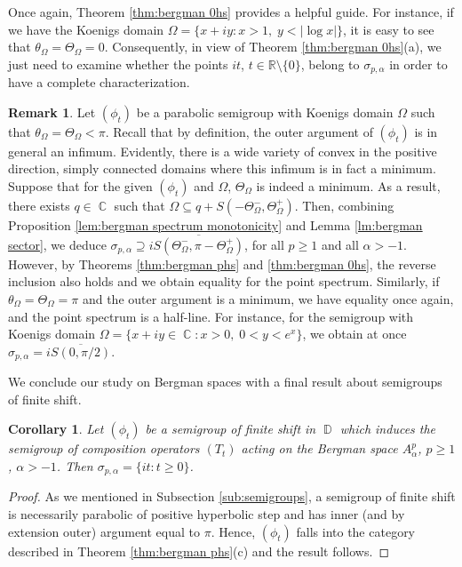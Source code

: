 \documentclass[11pt]{amsart}
\numberwithin{equation}{section}
\newtheorem{corollary}[theorem]{Corollary}
\theoremstyle{definition}
\newtheorem{remark}[theorem]{Remark}
\DeclareMathOperator{\C}{\mathbb{C}}
\DeclareMathOperator{\D}{\mathbb{D}}
\begin{document}
	Once again, Theorem \ref{thm:bergman 0hs} provides a helpful guide. For instance, if we have the Koenigs domain $\Omega=\{x+iy:x>1,\; y<|\log x|\}$, it is easy to see that $\theta_\Omega=\Theta_\Omega=0$. Consequently, in view of Theorem \ref{thm:bergman 0hs}(a), we just need to examine whether the points $it$, $t\in\mathbb{R}\setminus\{0\}$, belong to $\sigma_{p,\alpha}$ in order to have a complete characterization.
	
	\begin{remark}\label{rem:equality when outer argument is minimum}
		Let $(\phi_t)$ be a parabolic semigroup with Koenigs domain $\Omega$ such that $\theta_\Omega=\Theta_\Omega<\pi$. Recall that by definition, the outer argument of $(\phi_t)$ is in general an infimum. Evidently, there is a wide variety of convex in the positive direction, simply connected domains where this infimum is in fact a minimum. Suppose that for the given $(\phi_t)$ and $\Omega$, $\Theta_\Omega$ is indeed a minimum. As a result, there exists $q\in\C$ such that $\Omega\subseteq q+S(-\Theta_\Omega^-,\Theta_\Omega^+)$. Then, combining Proposition \ref{lem:bergman spectrum monotonicity} and Lemma \ref{lm:bergman sector}, we deduce $\sigma_{p,\alpha}\supseteq i\overline{S(\Theta_\Omega^-,\pi-\Theta_\Omega^+)}$, for all $p\ge1$ and all $\alpha>-1$. However, by Theorems \ref{thm:bergman phs} and \ref{thm:bergman 0hs}, the reverse inclusion also holds and we obtain equality for the point spectrum. Similarly, if $\theta_\Omega=\Theta_\Omega=\pi$ and the outer argument is a minimum, we have equality once again, and the point spectrum is a half-line. For instance, for the semigroup with Koenigs domain $\Omega=\{x+iy\in\C:x>0,\; 0<y<e^x\}$, we obtain at once $\sigma_{p,\alpha}=i\overline{S(0,\pi/2)}$.
	\end{remark}
	
	We conclude our study on Bergman spaces with a final result about semigroups of finite shift.
	
	\begin{corollary}\label{cor:bergman finite shift}
		Let $(\phi_t)$ be a semigroup of finite shift in $\D$ which induces the semigroup of composition operators $(T_t)$ acting on the Bergman space $A_\alpha^p$, $p\ge1$, $\alpha>-1$. Then
		$\sigma_{p,\alpha}=\{it:t\ge0\}$.
	\end{corollary}
	\begin{proof}
		As we mentioned in Subsection \ref{sub:semigroups}, a semigroup of finite shift is necessarily parabolic of positive hyperbolic step and has inner (and by extension outer) argument equal to $\pi$. Hence, $(\phi_t)$ falls into the category described in Theorem \ref{thm:bergman phs}(c) and the result follows.
	\end{proof}
	
\end{document}
